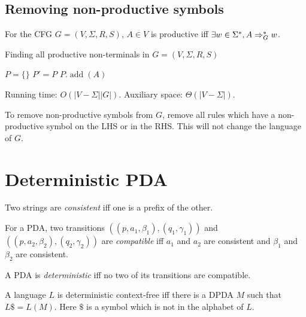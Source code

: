 \subsection{Removing non-productive symbols}

\begin{definition}
For the CFG $G = (V, \Sigma, R, S)$, $A \in V$ is productive iff
$\exists w \in \Sigma^*, A \Rightarrow_{G}^* w$.
\end{definition}

\begin{algorithm}[H]
\caption{Finding all productive non-terminals in $G = (V, \Sigma, R, S)$}
\label{algo-productive-non-terminals}
\begin{algorithmic}
\State $P = \{\}$
\Do
    \State $P' = P$
            \State $P.\operatorname{add}(A)$
        \EndIf
    \EndFor
{}
\end{algorithmic}
\end{algorithm}

Running time: $O(|V-\Sigma||G|)$.
Auxiliary space: $\Theta(|V-\Sigma|)$.

To remove non-productive symbols from $G$, remove all rules which
have a non-productive symbol on the LHS or in the RHS.
This will not change the language of $G$.

\section{Deterministic PDA}

\begin{definition}
Two strings are \emph{consistent} iff one is a prefix of the other.
\end{definition}
\begin{definition}
For a PDA, two transitions $((p, a_1, \beta_1), (q_1, \gamma_1))$
and $((p, a_2, \beta_2), (q_2, \gamma_2))$ are \emph{compatible} iff
$a_1$ and $a_2$ are consistent and $\beta_1$ and $\beta_2$ are consistent.
\end{definition}
\begin{definition}
A PDA is \emph{deterministic} iff no two of its transitions are compatible.
\end{definition}
\begin{definition}
A language $L$ is deterministic context-free iff there is a DPDA $M$
such that $L\$ = L(M)$. Here $\$$ is a symbol which is not in the alphabet of $L$.
\end{definition}

